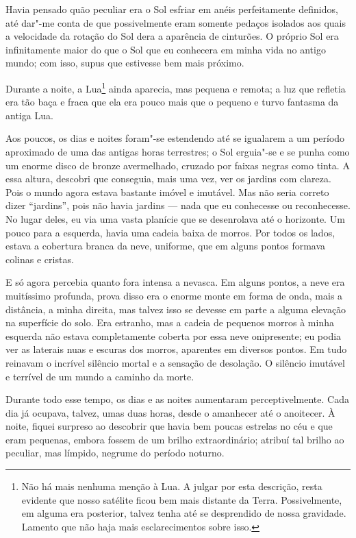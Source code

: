 Havia pensado quão peculiar era o Sol esfriar em anéis perfeitamente definidos, até dar"-me conta de que possivelmente
eram somente pedaços isolados aos quais a velocidade da rotação do Sol dera a aparência de cinturões. O próprio Sol era
infinitamente maior do que o Sol que eu conhecera em minha vida no antigo mundo; com isso, supus que estivesse bem
mais próximo.

Durante a noite, a Lua\footnote{ Não há mais nenhuma menção à Lua. A julgar
por esta descrição, resta evidente que nosso satélite ficou bem mais
distante da Terra. Possivelmente, em alguma era posterior, talvez tenha até se
desprendido de nossa gravidade. Lamento que não haja mais esclarecimentos sobre
isso.} ainda aparecia, mas pequena e remota; a luz que refletia era
tão baça e fraca que ela era pouco mais que o pequeno e turvo fantasma da antiga Lua.

Aos poucos, os dias e noites foram"-se estendendo até se igualarem a um período aproximado de uma das antigas horas
terrestres; o Sol erguia"-se e se punha como um enorme disco de bronze avermelhado, cruzado por faixas negras como
tinta. A essa altura, descobri que conseguia, mais uma vez, ver os jardins com clareza. Pois o mundo agora estava
bastante imóvel e imutável. Mas não seria correto dizer ``jardins'', pois não havia jardins --- nada que eu conhecesse ou
reconhecesse. No lugar deles, eu via uma vasta planície que se desenrolava até o horizonte. Um pouco para a esquerda,
havia uma cadeia baixa de morros. Por todos os lados, estava a cobertura branca da neve, uniforme, que em alguns pontos
formava colinas e cristas.

E só agora percebia quanto fora intensa a nevasca. Em alguns pontos, a neve era muitíssimo profunda, prova
disso era o enorme monte em forma de onda, mais a distância, a minha direita, mas talvez isso se devesse em parte a alguma
elevação na superfície do solo. Era estranho, mas a cadeia de pequenos morros à minha esquerda não estava completamente
coberta por essa neve onipresente; eu podia ver as laterais nuas e escuras dos morros, aparentes em diversos pontos. Em
tudo reinavam o incrível silêncio mortal e a sensação de desolação. O silêncio imutável e terrível de um mundo a
caminho da morte.

Durante todo esse tempo, os dias e as noites aumentaram perceptivelmente. Cada dia já ocupava, talvez, umas duas horas,
desde o amanhecer até o anoitecer. À noite, fiquei surpreso ao descobrir que havia bem poucas estrelas no céu e que
eram pequenas, embora fossem de um brilho extraordinário; atribuí tal brilho ao peculiar, mas límpido, negrume do
período noturno.

